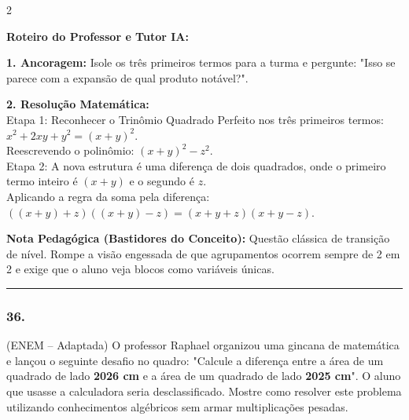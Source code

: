 \begin{multicols*}{2}
\ifgabarito
    \begin{tcolorbox}[colback=CorTitUm!5, colframe=CorTitUm, boxrule=1pt, arc=4pt, left=6pt, right=6pt, top=6pt, bottom=6pt]
    \small\textbf{\textcolor{CorTitUm}{Roteiro do Professor e Tutor IA:}}\par\vspace{0.1cm}
    \color{CinzaEscuro}
    \textbf{1. Ancoragem:} Isole os três primeiros termos para a turma e pergunte: "Isso se parece com a expansão de qual produto notável?".\par\vspace{0.1cm}
    \textbf{2. Resolução Matemática:}\\
    Etapa 1: Reconhecer o Trinômio Quadrado Perfeito nos três primeiros termos:\\
    $x^2 + 2xy + y^2 = (x + y)^2$.\\
    Reescrevendo o polinômio: $(x + y)^2 - z^2$.\\
    Etapa 2: A nova estrutura é uma diferença de dois quadrados, onde o primeiro termo inteiro é $(x+y)$ e o segundo é $z$.\\
    Aplicando a regra da soma pela diferença:\\
    $((x + y) + z)((x + y) - z) = (x + y + z)(x + y - z)$.
    \end{tcolorbox}
    \vspace{0.15cm}
    
    \begin{boxexplicacao}
    \textbf{Nota Pedagógica (Bastidores do Conceito):} Questão clássica de transição de nível. Rompe a visão engessada de que agrupamentos ocorrem sempre de 2 em 2 e exige que o aluno veja blocos como variáveis únicas.
    \end{boxexplicacao}
\fi

\par\vspace{\espacoQuestao}

\noindent\textcolor{CorLinha}{\rule{\linewidth}{0.5pt}} 
\par\vspace{\espacoPreQuestao}
\subsubsection*{36.} 
\begin{enunciadoLiteral}
(ENEM -- Adaptada) O professor Raphael organizou uma gincana de matemática e lançou o seguinte desafio no quadro: "Calcule a diferença entre a área de um quadrado de lado \textbf{2026 cm} e a área de um quadrado de lado \textbf{2025 cm}". 
O aluno que usasse a calculadora seria desclassificado. Mostre como resolver este problema utilizando conhecimentos algébricos sem armar multiplicações pesadas.
\end{enunciadoLiteral}


\end{multicols*}
